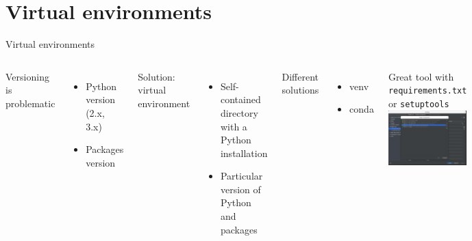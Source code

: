 \documentclass[10pt,compress]{beamer} %
\begin{document}
\section{Virtual environments}

\begin{frame}{Virtual environments}
	\begin{columns}
            Versioning is problematic
            \begin{itemize}
                \item Python version (2.x, 3.x)
                \item Packages version
            \end{itemize}
            Solution: \alert{virtual environment}
            \begin{itemize}
                \item Self-contained directory with a Python installation
                \item Particular version of Python and packages
            \end{itemize}
        	Different solutions
            \begin{itemize}
                \item venv
                \item conda
            \end{itemize}
		Great tool with \texttt{requirements.txt} or \texttt{setuptools}
	        \includegraphics[width=\linewidth]{figs/venv.png}\\
	\end{columns}
\end{frame}
\end{document}
